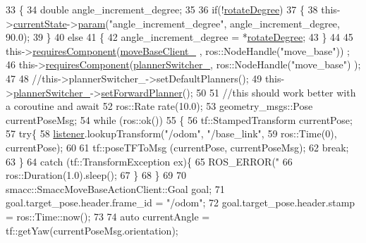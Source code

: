 \begin{DoxyCode}
33   \{
34     \textcolor{keywordtype}{double}  angle\_increment\_degree;
35 
36     \textcolor{keywordflow}{if}(!\hyperlink{classRotate_a0d494e54d8311aafe97bd44b381c039c}{rotateDegree})
37     \{
38         this->\hyperlink{classsmacc_1_1SmaccSubStateBehavior_a62e2b9da4a446f09396d0b4c01659b88}{currentState}->\hyperlink{classsmacc_1_1ISmaccState_a4982f2187ed6da337462721146e8ef70}{param}(\textcolor{stringliteral}{"angle\_increment\_degree"}, angle\_increment\_degree, 90.0);
39     \}
40     \textcolor{keywordflow}{else}
41     \{
42        angle\_increment\_degree = *\hyperlink{classRotate_a0d494e54d8311aafe97bd44b381c039c}{rotateDegree};
43     \}
44 
45     this->\hyperlink{classsmacc_1_1SmaccSubStateBehavior_a4d25c4ba8ec01c489df172a71bb1c37d}{requiresComponent}(\hyperlink{classRotate_ae632332fc9901b146697d5942d83ed42}{moveBaseClient\_} , ros::NodeHandle(\textcolor{stringliteral}{"move\_base"}))
      ;
46     this->\hyperlink{classsmacc_1_1SmaccSubStateBehavior_a4d25c4ba8ec01c489df172a71bb1c37d}{requiresComponent}(\hyperlink{classRotate_a83b5665eb3ccd4f4a1e38976bc6fec6e}{plannerSwitcher\_}, ros::NodeHandle(\textcolor{stringliteral}{"move\_base"})
      );
47     
48     \textcolor{comment}{//this->plannerSwitcher\_->setDefaultPlanners();}
49     this->\hyperlink{classRotate_a83b5665eb3ccd4f4a1e38976bc6fec6e}{plannerSwitcher\_}->\hyperlink{classsmacc__planner__switcher_1_1PlannerSwitcher_a6510ee1f23243ee725c61e590354d3bc}{setForwardPlanner}();
50 
51     \textcolor{comment}{//this should work better with a coroutine and await}
52     ros::Rate rate(10.0);
53     geometry\_msgs::Pose currentPoseMsg;
54     \textcolor{keywordflow}{while} (ros::ok())
55     \{
56         tf::StampedTransform currentPose;
57         \textcolor{keywordflow}{try}\{
58           \hyperlink{classRotate_ad8c08acbc62347f654d979f3e34c13dc}{listener}.lookupTransform(\textcolor{stringliteral}{"/odom"}, \textcolor{stringliteral}{"/base\_link"},  
59                                 ros::Time(0), currentPose);
60 
61           tf::poseTFToMsg (currentPose, currentPoseMsg);
62         \textcolor{keywordflow}{break};
63         \}
64         \textcolor{keywordflow}{catch} (tf::TransformException ex)\{
65         ROS\_ERROR(\textcolor{stringliteral}{"%
66         ros::Duration(1.0).sleep();
67         \}
68     \}   
69 
70     smacc::SmaccMoveBaseActionClient::Goal goal;
71     goal.target\_pose.header.frame\_id = \textcolor{stringliteral}{"/odom"};
72     goal.target\_pose.header.stamp = ros::Time::now();
73 
74     \textcolor{keyword}{auto} currentAngle = tf::getYaw(currentPoseMsg.orientation);
}
\end{DoxyCode}
